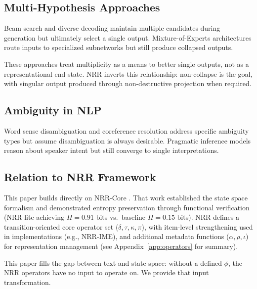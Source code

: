 \documentclass[11pt,a4paper]{article}
\begin{document}
\subsection{Multi-Hypothesis Approaches}

Beam search and diverse decoding \cite{vijayakumar2016diverse} 
maintain multiple candidates during generation but ultimately select a single output. 
Mixture-of-Experts architectures \cite{shazeer2017outrageously, fedus2021switch} route 
inputs to specialized subnetworks but still produce collapsed outputs.

These approaches treat multiplicity as a means to better single outputs, not as a 
representational end state. NRR inverts this relationship: non-collapse is the goal, 
with singular output produced through non-destructive projection when required.

\subsection{Ambiguity in NLP}

Word sense disambiguation \cite{navigli2009word} and coreference resolution 
\cite{lee2017end} address specific ambiguity types but assume disambiguation is 
always desirable. Pragmatic inference models \cite{goodman2016pragmatic} reason about 
speaker intent but still converge to single interpretations.

\subsection{Relation to NRR Framework}

This paper builds directly on NRR-Core \cite{saito2025nrr}. That work established 
the state space formalism and demonstrated entropy preservation through functional verification (NRR-lite achieving $H = 0.91$ bits vs.\ baseline $H = 0.15$ bits). 
NRR defines a transition-oriented core operator set ($\delta, \tau, \kappa, \pi$), with
item-level strengthening used in implementations (e.g., NRR-IME), and additional
metadata functions ($\alpha, \rho, \iota$) for representation management
(see Appendix~\ref{app:operators} for summary).

This paper fills the gap between text and state space: without a defined $\phi$, 
the NRR operators have no input to operate on. We provide that input transformation.

\end{document}
